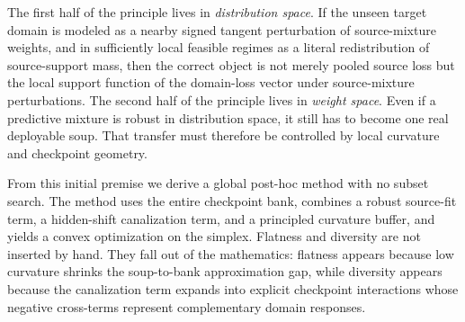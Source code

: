 \documentclass[11pt]{article}
\newcommand{\1}{\mathbf{1}}
\theoremstyle{plain}
\theoremstyle{definition}
\theoremstyle{remark}
\begin{document}
The first half of the principle lives in \emph{distribution space}. If the unseen target domain is modeled as a nearby signed tangent perturbation of source-mixture weights, and in sufficiently local feasible regimes as a literal redistribution of source-support mass, then the correct object is not merely pooled source loss but the local support function of the domain-loss vector under source-mixture perturbations. The second half of the principle lives in \emph{weight space}. Even if a predictive mixture is robust in distribution space, it still has to become one real deployable soup. That transfer must therefore be controlled by local curvature and checkpoint geometry.

From this initial premise we derive a global post-hoc method with no subset search. The method uses the entire checkpoint bank, combines a robust source-fit term, a hidden-shift canalization term, and a principled curvature buffer, and yields a convex optimization on the simplex. Flatness and diversity are not inserted by hand. They fall out of the mathematics: flatness appears because low curvature shrinks the soup-to-bank approximation gap, while diversity appears because the canalization term expands into explicit checkpoint interactions whose negative cross-terms represent complementary domain responses.
\end{document}
